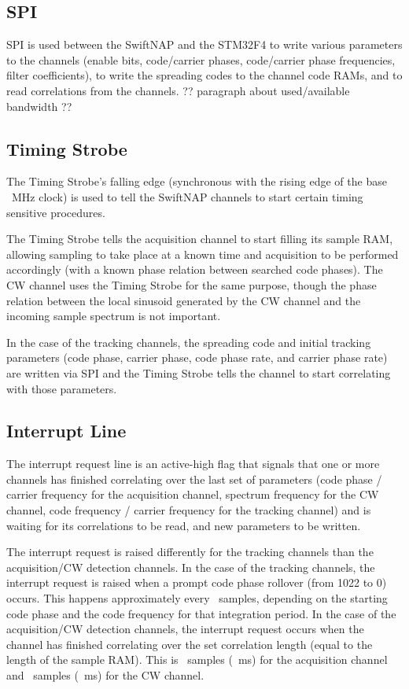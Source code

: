 \documentclass{article}
\begin{document}
\begin{multicols}{2}
\subsection{SPI}
SPI is used between the SwiftNAP and the STM32F4 to write various parameters to the channels (enable bits, code/carrier phases, code/carrier phase frequencies, filter coefficients), to write the spreading codes to the channel code RAMs, and to read correlations from the channels. ?? paragraph about used/available bandwidth ??
\subsection{Timing Strobe} 
The Timing Strobe's falling edge (synchronous with the rising edge of the base \feclkfreq\ MHz clock) is used to tell the SwiftNAP channels to start certain timing sensitive procedures. 

The Timing Strobe tells the acquisition channel to start filling its sample RAM, allowing sampling to take place at a known time and acquisition to be performed accordingly (with a known phase relation between searched code phases). The CW channel uses the Timing Strobe for the same purpose, though the phase relation between the local sinusoid generated by the CW channel and the incoming sample spectrum is not important. 

In the case of the tracking channels, the spreading code and initial tracking parameters (code phase, carrier phase, code phase rate, and carrier phase rate) are written via SPI and the Timing Strobe tells the channel to start correlating with those parameters.
\subsection{Interrupt Line}
The interrupt request line is an active-high flag that signals that one or more channels has finished correlating over the last set of parameters (code phase / carrier frequency for the acquisition channel, spectrum frequency for the CW channel, code frequency / carrier frequency for the tracking channel) and is waiting for its correlations to be read, and new parameters to be written.

The interrupt request is raised differently for the tracking channels than the acquisition/CW detection channels. In the case of the tracking channels, the interrupt request is raised when a prompt code phase rollover (from 1022 to 0) occurs. This happens approximately every \samplesperms\ samples, depending on the starting code phase and the code frequency for that integration period. In the case of the acquisition/CW detection channels, the interrupt request occurs when the channel has finished correlating over the set correlation length (equal to the length of the sample RAM). This is \acqlength\ samples (\acqms\ ms) for the acquisition channel and \cwlength\ samples (\cwms\ ms) for the CW channel.

\end{multicols}
\end{document}
